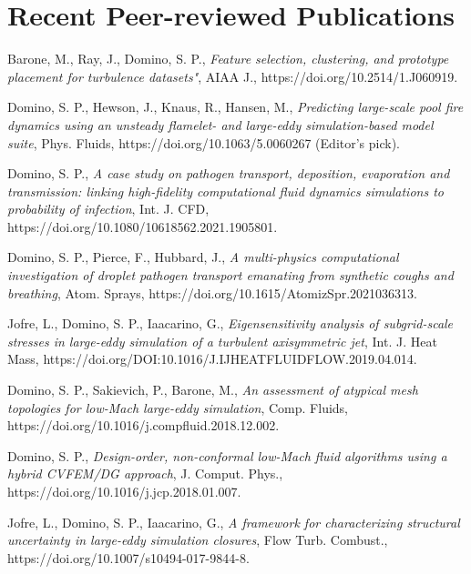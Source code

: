 \documentclass[letterpaper]{twentysecondcv_spd} %
\begin{document}
\section{Recent Peer-reviewed Publications}

\begin{twentyshort} %

 {Barone, M., Ray, J., Domino, S. P., \textit{Feature selection, clustering, and prototype placement for turbulence datasets"}, AIAA J., https://doi.org/10.2514/1.J060919.}

 {Domino, S. P., Hewson, J., Knaus, R., Hansen, M., \textit{Predicting large-scale pool fire dynamics using an unsteady flamelet- and large-eddy simulation-based model suite}, Phys. Fluids, https://doi.org/10.1063/5.0060267 (Editor's pick).}

 {Domino,  S. P., \textit{A case study on pathogen transport, deposition, evaporation and transmission: linking high-fidelity computational fluid dynamics simulations to probability of infection}, Int. J. CFD, https://doi.org/10.1080/10618562.2021.1905801.}

 {Domino, S. P., Pierce, F., Hubbard, J.,  \textit{A multi-physics computational investigation of droplet pathogen transport emanating from synthetic coughs and breathing}, Atom. Sprays, https://doi.org/10.1615/AtomizSpr.2021036313.}

 {Jofre, L., Domino, S. P., Iaacarino, G.,  \textit{Eigensensitivity analysis of subgrid-scale stresses in large-eddy simulation of a turbulent axisymmetric jet}, Int. J. Heat Mass, https://doi.org/DOI:10.1016/J.IJHEATFLUIDFLOW.2019.04.014.}

 {Domino, S. P., Sakievich, P., Barone, M., \textit{An assessment of atypical mesh topologies for low-Mach large-eddy simulation}, Comp. Fluids, https://doi.org/10.1016/j.compfluid.2018.12.002.}

 {Domino, S. P., \textit{Design-order, non-conformal low-Mach fluid algorithms using a hybrid CVFEM/DG approach}, J. Comput. Phys., https://doi.org/10.1016/j.jcp.2018.01.007.}

 {Jofre, L., Domino, S. P.,  Iaacarino, G., \textit{A framework for characterizing structural uncertainty in large-eddy simulation closures}, Flow Turb. Combust., https://doi.org/10.1007/s10494-017-9844-8.}

\end{twentyshort} 
\end{document}
